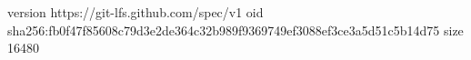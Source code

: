 version https://git-lfs.github.com/spec/v1
oid sha256:fb0f47f85608c79d3e2de364c32b989f9369749ef3088ef3ce3a5d51c5b14d75
size 16480
